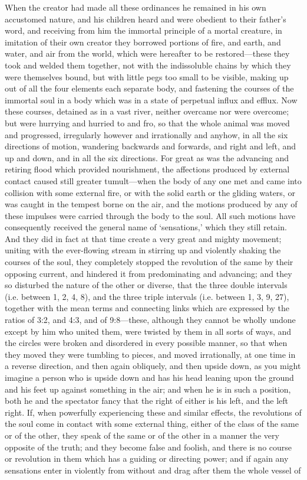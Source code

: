 \documentclass[11pt,letter]{article}
\begin{document}
\par  When the creator had made all these ordinances he remained in his own accustomed nature, and his children heard and were obedient to their father’s word, and receiving from him the immortal principle of a mortal creature, in imitation of their own creator they borrowed portions of fire, and earth, and water, and air from the world, which were hereafter to be restored—these they took and welded them together, not with the indissoluble chains by which they were themselves bound, but with little pegs too small to be visible, making up out of all the four elements each separate body, and fastening the courses of the immortal soul in a body which was in a state of perpetual influx and efflux. Now these courses, detained as in a vast river, neither overcame nor were overcome; but were hurrying and hurried to and fro, so that the whole animal was moved and progressed, irregularly however and irrationally and anyhow, in all the six directions of motion, wandering backwards and forwards, and right and left, and up and down, and in all the six directions. For great as was the advancing and retiring flood which provided nourishment, the affections produced by external contact caused still greater tumult—when the body of any one met and came into collision with some external fire, or with the solid earth or the gliding waters, or was caught in the tempest borne on the air, and the motions produced by any of these impulses were carried through the body to the soul. All such motions have consequently received the general name of ‘sensations,’ which they still retain. And they did in fact at that time create a very great and mighty movement; uniting with the ever-flowing stream in stirring up and violently shaking the courses of the soul, they completely stopped the revolution of the same by their opposing current, and hindered it from predominating and advancing; and they so disturbed the nature of the other or diverse, that the three double intervals (i.e. between 1, 2, 4, 8), and the three triple intervals (i.e. between 1, 3, 9, 27), together with the mean terms and connecting links which are expressed by the ratios of 3:2, and 4:3, and of 9:8—these, although they cannot be wholly undone except by him who united them, were twisted by them in all sorts of ways, and the circles were broken and disordered in every possible manner, so that when they moved they were tumbling to pieces, and moved irrationally, at one time in a reverse direction, and then again obliquely, and then upside down, as you might imagine a person who is upside down and has his head leaning upon the ground and his feet up against something in the air; and when he is in such a position, both he and the spectator fancy that the right of either is his left, and the left right. If, when powerfully experiencing these and similar effects, the revolutions of the soul come in contact with some external thing, either of the class of the same or of the other, they speak of the same or of the other in a manner the very opposite of the truth; and they become false and foolish, and there is no course or revolution in them which has a guiding or directing power; and if again any sensations enter in violently from without and drag after them the whole vessel of 
\end{document}
